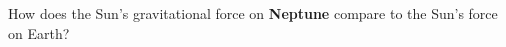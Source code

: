 \documentclass{article}
\begin{document}
\begin{problem}
How does the Sun's gravitational force on \textbf{Neptune} compare to the Sun's force on Earth? 
\end{problem}


\printnoidxglossaries
\end{document}

